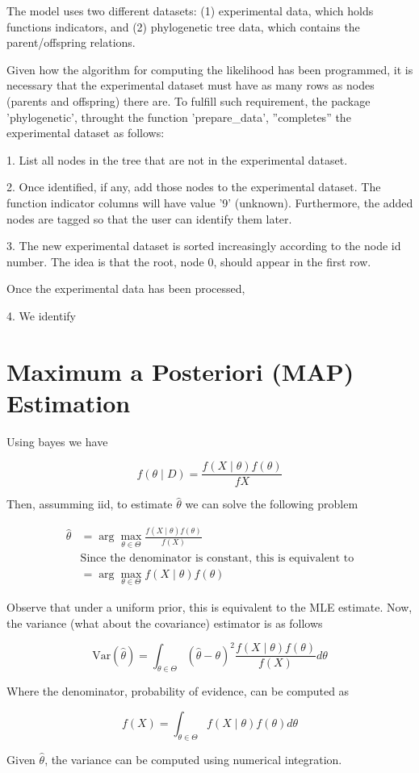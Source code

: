 \documentclass{article}
\newcommand{\f}[1]{{f\left(#1\right) }}
\newcommand{\fcond}[2]{{f\left(#1\;|\;#2\right) }}
\begin{document}
The model uses two different datasets: (1) experimental data, which holds functions indicators, and (2) phylogenetic tree data, which contains the parent/offspring relations.

Given how the algorithm for computing the likelihood has been programmed, it is necessary that the experimental dataset must have as many rows as nodes (parents and offspring) there are. To fulfill such requirement, the package 'phylogenetic', throught the function 'prepare\_data', ''completes'' the experimental dataset as follows:

1.  List all nodes in the tree that are not in the experimental dataset.

2.  Once identified, if any, add those nodes to the experimental dataset. The
    function indicator columns will have value '9' (unknown). Furthermore, the
    added nodes are tagged so that the user can identify them later.
    
3.  The new experimental dataset is sorted increasingly according to the node
    id number. The idea is that the root, node 0, should appear in the
    first row.
    
Once the experimental data has been processed, 
    
4.  We identify

\section{ Maximum a Posteriori (MAP) Estimation}

Using bayes we have

$$
\fcond{\theta}{D} = \frac{\fcond{X}{\theta}\f{\theta}}{f{X}}
$$

Then, assumming iid, to estimate $\hat \theta$ we can solve the following problem

\begin{align*}
\label{eq:maptheta}
\hat \theta & = \arg\max_{\theta \in \Theta} \frac{\fcond{X}{\theta}\f{\theta}}{\f{X}} \\
 & \mbox{Since the denominator is constant, this is equivalent to} \\
 & = \arg\max_{\theta \in \Theta} \fcond{X}{\theta}\f{\theta} \tag{MAP estimate} 
\end{align*}


Observe that under a uniform prior, this is equivalent to the MLE estimate. Now, the variance (what about the covariance) estimator is as follows

\begin{equation}
\label{eq:mapvar}
\mbox{Var}\left(\hat\theta\right) = \int_{\theta \in \Theta} \left(\hat\theta - \theta\right)^2
\frac{\fcond{X}{\theta}\f{\theta}}{\f{X}} d\theta \tag{MAP variance}
\end{equation}

Where the denominator, probability of evidence, can be computed as

$$
\label{eq:d}
\f{X} = \int_{\theta \in \Theta} \fcond{X}{\theta}\f{\theta}d\theta 
$$

Given $\hat \theta$, the variance can be computed using numerical integration.
\end{document}
